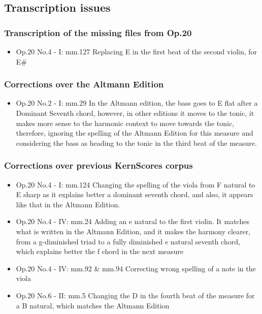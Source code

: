	\subsection{Transcription issues}
		\subsubsection{Transcription of the missing files from Op.20}
    \begin{itemize}
    \item Op.20 No.4 - I: mm.127
		Replacing E in the first beat of the second violin, for E\#
    \end{itemize}
    \subsubsection{Corrections over the Altmann Edition}
    \begin{itemize}
    \item Op.20 No.2 - I: mm.29
    In the Altmann edition, the bass goes to E flat after a Dominant Seventh chord, however, in other editions it moves to the tonic, it makes more sense to the harmonic context to move towards the tonic, therefore, ignoring the spelling of the Altmann Edition for this measure and considering the bass as heading to the tonic in the third beat of the measure.
    \end{itemize}
		\subsubsection{Corrections over previous KernScores corpus}
    \begin{itemize}
    \item Op.20 No.4 - I: mm.124
    Changing the spelling of the viola from F natural to E sharp as it explains better a dominant seventh chord, and also, it appears like that in the Altmann Edition.

    \item Op.20 No.4 - IV: mm.24
    Adding an e natural to the first violin. It matches what is written in the Altmann Edition, and it makes the harmony clearer, from a g-diminished triad to a fully diminished e natural seventh chord, which explains better the f chord in the next measure

    \item Op.20 No.4 - IV: mm.92 \& mm.94
    Correcting wrong spelling of a note in the viola

    \item Op.20 No.6 - II: mm.5
    Changing the D in the fourth beat of the measure for a B natural, which matches the Altmann Edition
    \end{itemize}
